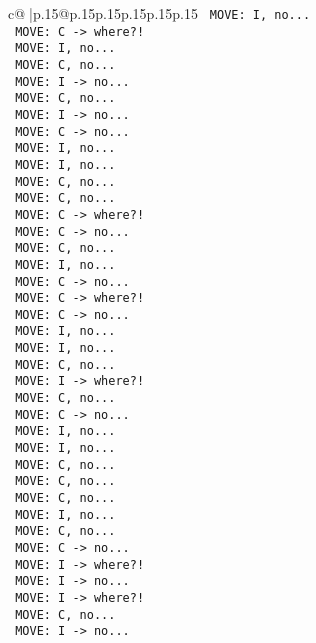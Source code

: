 \documentclass{article}
\begin{document}
{\begin{supertabular}{c@{$\;$}|p{.15\linewidth}@{}p{.15\linewidth}p{.15\linewidth}p{.15\linewidth}p{.15\linewidth}p{.15\linewidth}}
{{{\texttt{ MOVE: I, no...} \\
\texttt{ MOVE: C {-}> where?!} \\
\texttt{ MOVE: I, no...} \\
\texttt{ MOVE: C, no...} \\
\texttt{ MOVE: I {-}> no...} \\
\texttt{ MOVE: C, no...} \\
\texttt{ MOVE: I {-}> no...} \\
\texttt{ MOVE: C {-}> no...} \\
\texttt{ MOVE: I, no...} \\
\texttt{ MOVE: I, no...} \\
\texttt{ MOVE: C, no...} \\
\texttt{ MOVE: C, no...} \\
\texttt{ MOVE: C {-}> where?!} \\
\texttt{ MOVE: C {-}> no...} \\
\texttt{ MOVE: C, no...} \\
\texttt{ MOVE: I, no...} \\
\texttt{ MOVE: C {-}> no...} \\
\texttt{ MOVE: C {-}> where?!} \\
\texttt{ MOVE: C {-}> no...} \\
\texttt{ MOVE: I, no...} \\
\texttt{ MOVE: I, no...} \\
\texttt{ MOVE: C, no...} \\
\texttt{ MOVE: I {-}> where?!} \\
\texttt{ MOVE: C, no...} \\
\texttt{ MOVE: C {-}> no...} \\
\texttt{ MOVE: I, no...} \\
\texttt{ MOVE: I, no...} \\
\texttt{ MOVE: C, no...} \\
\texttt{ MOVE: C, no...} \\
\texttt{ MOVE: C, no...} \\
\texttt{ MOVE: I, no...} \\
\texttt{ MOVE: C, no...} \\
\texttt{ MOVE: C {-}> no...} \\
\texttt{ MOVE: I {-}> where?!} \\
\texttt{ MOVE: I {-}> no...} \\
\texttt{ MOVE: I {-}> where?!} \\
\texttt{ MOVE: C, no...} \\
\texttt{ MOVE: I {-}> no...} \\
}}}
\end{supertabular}}
\end{document}
